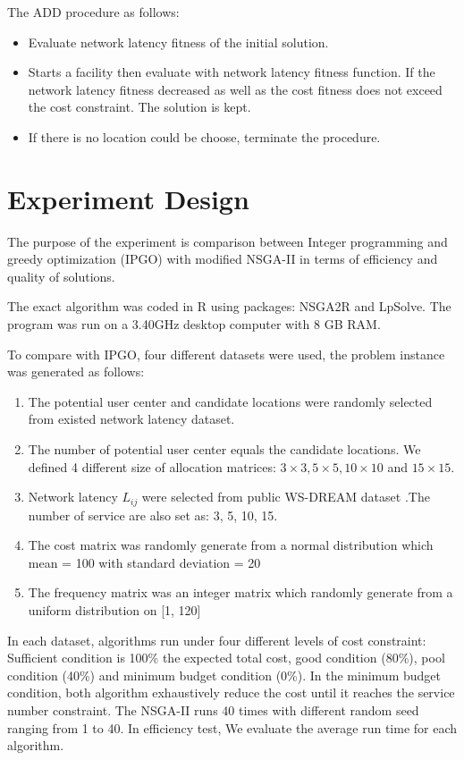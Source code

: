 \documentclass{llncs}
\begin{document}
 The ADD procedure as follows:
\begin{itemize}
	\item Evaluate network latency fitness of the initial solution.
	\item Starts a facility then evaluate with network latency fitness function. If the network latency fitness decreased as well as 
		the cost fitness does not exceed the cost constraint. The solution is kept.
	\item If there is no location could be choose, terminate the procedure.
\end{itemize}




\section{Experiment Design}
\label{sec:experiment}
The purpose of the experiment is comparison between Integer programming and greedy optimization (IPGO) with modified NSGA-II in terms of efficiency and quality of solutions. 

The exact algorithm was coded in R using packages: NSGA2R and LpSolve. The program was run on a 3.40GHz 
desktop computer with 8 GB RAM.

To compare with IPGO, four different datasets were used, the problem instance was generated as follows:
\begin{enumerate}
	\item The potential user center and candidate locations were randomly selected from existed network latency dataset. 
	\item The number of potential user center equals the candidate locations. We defined 4 different size of allocation matrices:
			$3 \times 3, 5 \times 5, 10 \times 10$ and $15 \times 15$.
		\item Network latency $L_{ij}$ were selected from public WS-DREAM dataset  \cite{6076756} \cite{5552800}.The number of service are also set as: 3, 5, 10, 15.
	\item The cost matrix was randomly generate from a normal distribution which mean = 100 with standard deviation = 20
	\item The frequency matrix was an integer matrix which randomly generate from a uniform distribution on [1, 120]
\end{enumerate}


In each dataset, algorithms run under four different levels of cost constraint: Sufficient condition is 100\% the expected total cost, 
good condition (80\%), pool condition (40\%) and minimum budget condition (0\%). In the minimum budget condition, 
both algorithm exhaustively reduce the cost until it reaches the service number constraint. The NSGA-II runs 40 times with different random 
seed ranging from 1 to 40. In efficiency test, We evaluate the average run time for each algorithm. 
\end{document}
